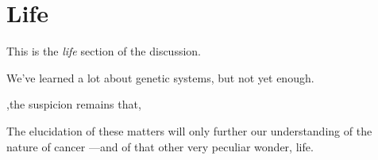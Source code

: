 \section{Life}
\label{life-discussion}

This is the \emph{life} section of the discussion.

We've learned a lot about genetic systems, but not yet enough.

,the suspicion remains that,


The elucidation of these matters will only further our understanding of the
nature of cancer
---and of that other very peculiar
wonder, life.

\clearpage

